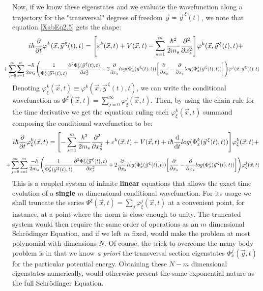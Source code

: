 \documentclass[11pt, a4paper]{article} %
\begin{document}
Now, if we know these eigenstates and we evaluate the wavefunction along a trajectory for the "transversal" degrees of freedom $\vec{y}=\vec{y}^{\, \xi}(t)$, we note that equation \eqref{XabEq2.5} gets the shape:
\begin{equation}
 i\hbar\pdv{}{t}\varphi^k(\vec{x},\vec{y}^{\, \xi}(t),t)=\qty[ \varepsilon^k(\vec{x},t)+V(\vec{x},t)  -\sum_{s=1}^m\frac{\hbar^2}{2m_s}\pdv[2]{}{x_s} ]\varphi^k(\vec{x},\vec{y}^{\, \xi}(t),t)+
\end{equation}
$$
\hspace{-0.6cm}+\sum_{j=0}^\infty\sum_{s=1}^m \frac{-\hbar}{2m_s}\qty( \frac{1}{\Phi^j_x(\vec{y}^{\, \xi}(t),t)}\pdv[2]{\Phi^j_x(\vec{y}^{\, \xi}(t),t)}{x_s}+2\pdv{}{x_s}log(\Phi^j_x(\vec{y}^{\, \xi}(t),t))\qty[\pdv{}{x_s}-\pdv{}{x_s}log(\Phi^j_x(\vec{y}^{\, \xi}(t),t))] )\varphi^j(\vec{x},\vec{y}^{\, \xi}(t),t)
$$
Denoting $\varphi^k_\xi(\vec{x},t)\equiv\varphi^k(\vec{x},\vec{y}^{\, \xi}(t),t)$, we can write the conditional wavefunction as $\Psi^\xi(\vec{x},t)=\sum_{j=0}^\infty \varphi^j_\xi(\vec{x},t)$. Then, by using the chain rule for the time derivative we get the equations ruling each $\varphi^k_\xi(\vec{x},t)$ summand composing the conditional wavefunction to be:
\begin{equation}\label{XabEq3}
 i\hbar\pdv{}{t}\varphi^k_\xi(\vec{x},t)=\qty[-\sum_{s=1}^m\frac{\hbar^2}{2m_s}\pdv[2]{}{x_s}+ \varepsilon^k(\vec{x},t)+V(\vec{x},t)   +i\hbar \dv{}{t}log(\Phi^k_x(\vec{y}^{\, \xi}(t),t))]\varphi^k_\xi(\vec{x},t)+
\end{equation}
$$
\hspace{-0.4cm}+\sum_{j=0}^\infty\sum_{s=1}^m \frac{-\hbar}{2m_s}\qty( \frac{1}{\Phi^j_x(\vec{y}^{\, \xi}(t),t)}\pdv[2]{\Phi^j_x(\vec{y}^{\, \xi}(t),t)}{x_s}+2\pdv{}{x_s}log(\Phi^j_x(\vec{y}^{\, \xi}(t),t))\qty[\pdv{}{x_s}-\pdv{}{x_s}log(\Phi^j_x(\vec{y}^{\, \xi}(t),t))] )\varphi^j_\xi(\vec{x},t)
$$
This is a coupled system of infinite {\bf linear} equations that allows the exact time evolution of a {\bf single} $m$ dimensional conditional wavefunction. For its usage we shall truncate the series $\Psi^\xi(\vec{x},t)=\sum_j \varphi^j_\xi(\vec{x},t)$ at a convenient point, for instance, at a point where the norm is close enough to unity. The truncated system would then require the same order of operations as an $m$ dimensional Schrödinger Equation, and if we left $m$ fixed, would make the problem at most polynomial with dimensions $N$. Of course, the trick to overcome the many body problem is in that we know {\em a priori} the transversal section eigenstates $\Phi^j_x(\vec{y},t)$ for the particular potential energy. Obtaining these $N-m$ dimensional eigenstates numerically, would otherwise present the same exponential nature as the full Schrödinger Equation.
\end{document}

